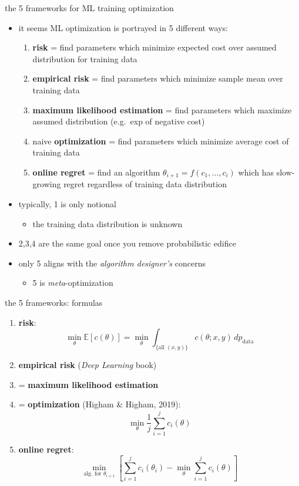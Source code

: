 \documentclass[svgnames,
               hyperref={colorlinks,citecolor=DeepPink4,linkcolor=FireBrick,urlcolor=Maroon},
               usepdftitle=false]  %
               {beamer}
\newcommand{\EE}{\mathbb{E}}
\begin{document}
\begin{frame}{the 5 frameworks for ML training optimization}

\begin{itemize}
\item it seems ML optimization is portrayed in 5 different ways:

\medskip
    \begin{enumerate}
    \item[1.] \textbf{risk} = find parameters which minimize expected cost over assumed distribution for training data
    \item[2.] \textbf{empirical risk} = find parameters which minimize sample mean over training data
    \item[3.] \textbf{maximum likelihood estimation} = find parameters which maximize assumed distribution (e.g.~exp of negative cost)
    \item[4.] naive \textbf{optimization} = find parameters which minimize average cost of training data
    \item[5.] \textbf{online regret} = find an algorithm $\theta_{i+1}=f(c_1,\dots,c_i)$ which has slow-growing regret regardless of training data distribution
    \end{enumerate}

\bigskip
\item typically, 1 is only notional
    \begin{itemize}
    \item[$-$] the training data distribution is unknown
    \end{itemize}
\item 2,3,4 are the same goal once you remove probabilistic edifice
\item only 5 aligns with the \emph{algorithm designer's} concerns
    \begin{itemize}
    \item[$-$] 5 is \emph{meta}-optimization
    \end{itemize}
\end{itemize}
\end{frame}


\begin{frame}{the 5 frameworks: formulas}

\begin{enumerate}
\item[1.] \textbf{risk}:
    $$\min_\theta \EE[c(\theta)] = \min_\theta \int_{\{\text{all } (x,y)\}} c(\theta;x,y)\,dp_{\text{data}}$$
\item[2.] \textbf{empirical risk} (\emph{Deep Learning} book)
\item[3.] = \textbf{maximum likelihood estimation}
\item[4.] = \textbf{optimization} (Higham \& Higham, 2019):
    $$\min_\theta \frac{1}{j} \sum_{i=1}^j c_i(\theta)$$
\item[5.] \textbf{online regret}:
    $$\min_{\text{alg.~for } \theta_{i+1}} \left[\sum_{i=1}^j c_i(\theta_i) - \min_\theta \sum_{i=1}^j c_i(\theta)\right]$$
\end{enumerate}
\end{frame}
\end{document}
